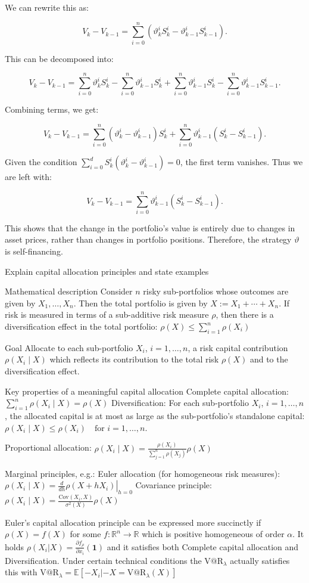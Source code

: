 We can rewrite this as:

\[
V_k - V_{k-1} = \sum_{i=0}^n (\vartheta^i_k S^i_k - \vartheta^i_{k-1} S^i_{k-1}).
\]

This can be decomposed into:

\[
V_k - V_{k-1} = \sum_{i=0}^n \vartheta^i_k S^i_k - \sum_{i=0}^n \vartheta^i_{k-1} S^i_k + \sum_{i=0}^n \vartheta^i_{k-1} S^i_k - \sum_{i=0}^n \vartheta^i_{k-1} S^i_{k-1}.
\]

Combining terms, we get:

\[
V_k - V_{k-1} = \sum_{i=0}^n (\vartheta^i_k - \vartheta^i_{k-1}) S^i_k + \sum_{i=0}^n \vartheta^i_{k-1} (S^i_k - S^i_{k-1}).
\]

Given the condition \(\sum_{i=0}^d S^i_k (\vartheta^i_k - \vartheta^i_{k-1}) = 0\), the first term vanishes. Thus we are left with:

\[
V_k - V_{k-1} = \sum_{i=0}^n \vartheta^i_{k-1} (S^i_k - S^i_{k-1}).
\]

This shows that the change in the portfolio's value is entirely due to changes in asset prices, rather than changes in portfolio positions. Therefore, the strategy \(\vartheta\) is self-financing.


Explain capital allocation principles and state examples

Mathematical description
Consider \(n\) risky sub-portfolios whose outcomes are given by \(X_1, \ldots, X_n\).
Then the total portfolio is given by \(X := X_1 + \cdots + X_n\).
If risk is measured in terms of a sub-additive risk measure \(\rho\), then there is a diversification effect in the total portfolio:
\(
\rho(X) \leq \sum_{i=1}^n \rho(X_i)
\)

Goal
Allocate to each sub-portfolio \(X_i\), \(i = 1, \ldots, n\), a risk capital contribution \(\rho(X_i \mid X)\) which reflects its contribution 
to the total risk \(\rho(X)\) and to the diversification effect.

Key properties of a meaningful capital allocation
Complete capital allocation: \(\sum_{i=1}^n \rho(X_i \mid X) = \rho(X)\)
Diversification: For each sub-portfolio \(X_i\), \(i = 1, \ldots, n\), the allocated capital is at most as large as the sub-portfolio’s standalone capital:
\(
\rho(X_i \mid X) \leq \rho(X_i) \quad \text{for } i = 1, \ldots, n.
\)


Proportional allocation:
\(
\rho(X_i \mid X) = \frac{\rho(X_i)}{\sum_{j=1}^n \rho(X_j)} \rho(X)
\)

Marginal principles, e.g.:
Euler allocation (for homogeneous risk measures):
\(
\rho(X_i \mid X) = \left. \frac{d}{dh} \rho(X + h X_i) \right|_{h=0}
\)
 Covariance principle:
\(
\rho(X_i \mid X) = \frac{\text{Cov}(X_i, X)}{\sigma^2(X)} \rho(X)
\)

Euler's capital allocation principle can be expressed more succinctly if \( \rho(X) = f(X) \)
for some \( f : \mathbb{R}^n \to \mathbb{R} \) which is positive homogeneous of order \( \alpha \).
It holds 
\( \rho(X_i|X) = \frac{\partial f_{\rho}}{\partial x_i}(\mathbf{1}) \)
and it satisfies both Complete capital allocation and Diversification.
Under certain technical conditions the \( \text{V@R}_{\lambda} \) actually satisfies this with 
\( \text{V@R}_{\lambda} = \mathbb{E}[-X_i| -X =\text{V@R}_{\lambda}(X)] \)
